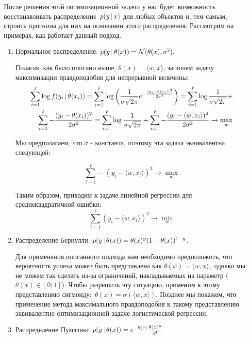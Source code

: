 \documentclass[12pt,a4paper]{article}
\begin{document}
    После решения этой оптимизационной задачи у нас будет возможность восстанавливать распределение~$p(y \mspace{3mu}{|}\mspace{3mu} x)$ для любых объектов и, тем самым, строить прогнозы для них на основании этого распределения. Рассмотрим на примерах, как работает данный подход.
    \newpage
    \begin{enumerate}
        \item Нормальное распределение: $p(y \mspace{3mu}{|}\mspace{3mu} \theta(x)) = \mathcal{N} (\theta(x), \sigma^2).$
        
        Полагая, как было описано выше, $\theta(x) = \langle w, x \rangle$, запишем задачу максимизации правдоподобия для непрерывной величины: 
        \begin{align*}
            \sum_{i=1}^\ell \log f(y_i \mspace{3mu}{|}\mspace{3mu} \theta(x_i)) =
            \sum_{i=1}^\ell 
            \log \left( \frac{1}{\sigma\sqrt{2\pi}} e^{-\frac{(y_i-\theta(x_i))^2}{2 \sigma^2}}
            \right)
            = 
            \sum_{i=1}^\ell
            \log \frac{1}{\sigma\sqrt{2\pi}}
            + \\
            \sum_{i=1}^\ell
            -\frac{(y_i-\theta(x_i))^2}{2 \sigma^2}
            =
            \sum_{i=1}^\ell
            \log \frac{1}{\sigma\sqrt{2\pi}}
            + 
            \sum_{i=1}^\ell
            -\frac{(y_i-\langle w, x_i \rangle)^2}{2 \sigma^2}
            \to \max_w
        \end{align*}
        
        Мы предполагаем, что $\sigma$ - константа, поэтому эта задача эквивалентна следующей: 
        
        \begin{equation*}
            \sum_{i=1}^\ell
            -(y_i-\langle w, x_i \rangle)^2
            \to \max_w
        \end{equation*}
        
        Таким образом, приходим к задаче линейной регрессии для среднеквадратичной ошибки:
        \begin{equation}
            \sum_{i=1}^\ell (y_i - \langle w, x_i \rangle)^2 \to \min_w
        \end{equation}
        \item Распределение Бернулли: $p(y \mspace{3mu}{|}\mspace{3mu} \theta(x)) = \theta(x)^{y} (1 - \theta(x))^{1 - y}$.
        
        Для применения описанного подхода нам необходимо предположить, что вероятность успеха может быть представлена как $\theta(x) = \langle w, x \rangle,$ однако мы не можем так сделать из-за ограничений, накладываемых на параметр ($\theta(x) \in [0; 1]$). Чтобы разрешить эту ситуацию, применим к этому представлению сигмоиду:~$\theta(x) = \sigma(\langle w, x \rangle)$. Позднее мы покажем, что применение метода максимального правдоподобия к такому представлению эквивалентно оптимизационной задаче логистической регрессии.
        \item Распределение Пуассона: $p(y \mspace{3mu}{|}\mspace{3mu} \theta(x)) = e^{- \theta(x)} \frac{\theta(x)^y}{y!}$
        

\end{enumerate}
\end{document}
